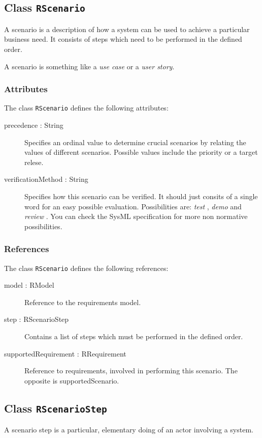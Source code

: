 \subsection{Class {\tt RScenario}}
A scenario is a description of how a system can be used to achieve a particular business need.
It consists of steps which need to be performed in the defined order.

A scenario is something like a \emph{use case} or a \emph{user story}.

\subsubsection{Attributes}
The class \verb|RScenario| defines the following attributes:
\begin{description}
	\item[precedence : String] Specifies an ordinal value to determine crucial scenarios by relating the values of different scenarios.
Possible values include the priority or a target relese.
	\item[verificationMethod : String] Specifies how this scenario can be verified.
It should just consits of a single word for an easy possible evaluation.
Possibilities are: \emph{test} , \emph{demo}  and \emph{review} . You can check the SysML specification for more non normative possibilities.
\end{description}

\subsubsection{References}
The class \verb|RScenario| defines the following references:
\begin{description}
	\item[model : RModel] Reference to the requirements model.
	\item[step : RScenarioStep] Contains a list of steps which must be performed in the defined order.
	\item[supportedRequirement : RRequirement] Reference to requirements, involved in performing this scenario. The opposite is supportedScenario.
\end{description}

\subsection{Class {\tt RScenarioStep}}
A scenario step is a particular, elementary doing of an actor involving a system.


